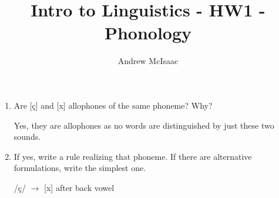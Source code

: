 \documentclass{article}
\title{Intro to Linguistics - HW1 - Phonology}
\author{Andrew McIsaac}
\begin{document}
\maketitle

\begin{enumerate}
	\item{Are [ç] and [x] allophones of the same phoneme? Why?}

		Yes, they are allophones as no words are distinguished by just these
		two sounds.

	\item{If yes, write a rule realizing that phoneme. If there are alternative
		formulations, write the simplest one.}

		/ç/ $\rightarrow$ [x] after back vowel

\end{enumerate}
\end{document}
